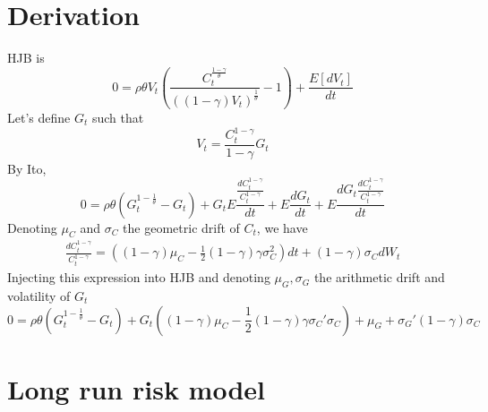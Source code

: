 \documentclass[english]{article}
\begin{document}
\section{Derivation}
HJB is
$$0 = \rho \theta V_t(\frac{C_t^{\frac{1-\gamma}{\theta}}}{((1-\gamma)V_t)^{\frac{1}{\theta}}}-1) + \frac{E[dV_t]}{dt}$$
Let's define $G_t$ such that
$$V_t = \frac{C_t^{1-\gamma}}{1-\gamma} G_t$$
By Ito, 
$$0 = \rho\theta(G_t^{1-\frac{1}{\theta}}-G_t)   +  G_t E\frac{\frac{dC_t^{1-\gamma}}{C_t^{1-\gamma}}}{dt} + E\frac{dG_t}{dt} + E\frac{dG_t\frac{dC_t^{1-\gamma}}{C_t^{1-\gamma}}}{dt}$$
Denoting $\mu_{C}$ and $\sigma_{C}$ the geometric drift of $C_t$, we have
\begin{align*}
	\frac{dC_{t}^{1-\gamma}}{C_{t}^{1-\gamma}}=((1-\gamma)\mu_{C}-\frac{1}{2}(1-\gamma)\gamma\sigma^{2}_{C})dt + (1-\gamma)\sigma_{C}dW_t
\end{align*}
Injecting this expression into HJB and denoting $\mu_G, \sigma_G$ the arithmetic drift and volatility of $G_t$
$$0 = \rho \theta (G_t^{1-\frac{1}{\theta}}-G_t)  + G_t ((1-\gamma) \mu_{C} - \frac{1}{2}(1-\gamma)\gamma\sigma_{C}'\sigma_{C}) +  \mu_G + \sigma_G'(1-\gamma)\sigma_{C}$$

\section{Long run risk model}
\end{document}
